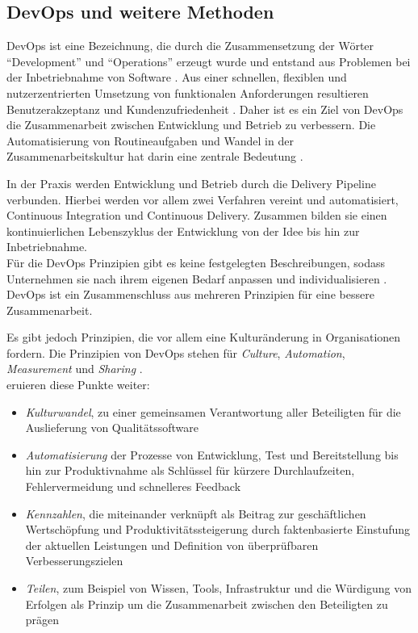 \subsection{DevOps und weitere Methoden}
DevOps ist eine Bezeichnung, die durch die Zusammensetzung der Wörter \enquote{Development} und \enquote{Operations} erzeugt wurde und entstand aus Problemen bei der Inbetriebnahme von Software \cite{mci/Disterer2011}. Aus einer schnellen, flexiblen und nutzerzentrierten Umsetzung von funktionalen Anforderungen resultieren Benutzerakzeptanz und Kundenzufriedenheit \cite{mci/Disterer2011, Alt2017}. Daher ist es ein Ziel von DevOps die Zusammenarbeit zwischen Entwicklung und Betrieb zu verbessern. Die Automatisierung von Routineaufgaben und Wandel in der Zusammenarbeitskultur hat darin eine zentrale Bedeutung \cite{Alt2017}. 

In der Praxis werden Entwicklung und Betrieb durch die Delivery Pipeline verbunden.
Hierbei werden vor allem zwei Verfahren vereint und automatisiert, Continuous Integration und Continuous Delivery. Zusammen bilden sie einen kontinuierlichen Lebenszyklus der Entwicklung von der Idee bis hin zur Inbetriebnahme.
\medskip
\\
Für die DevOps Prinzipien gibt es keine festgelegten Beschreibungen, sodass Unternehmen sie nach ihrem eigenen Bedarf anpassen und individualisieren \cite{Alt2017}. DevOps ist ein Zusammenschluss aus mehreren Prinzipien für eine bessere Zusammenarbeit.

Es gibt jedoch Prinzipien, die vor allem eine Kulturänderung in Organisationen fordern. Die Prinzipien von DevOps stehen für \emph{Culture}, \emph{Automation}, \emph{Measurement} und \emph{Sharing} \cite{humble:2011}. 
\medskip
\\
\citet[S.26f]{Alt2017} eruieren diese Punkte weiter:
\begin{itemize}
    \item \emph{Kulturwandel}, zu einer gemeinsamen Verantwortung aller Beteiligten für die Auslieferung von Qualitätssoftware
    \item \emph{Automatisierung} der Prozesse von Entwicklung, Test und Bereitstellung bis hin zur Produktivnahme als Schlüssel für kürzere Durchlaufzeiten, Fehlervermeidung und schnelleres Feedback
    \item \emph{Kennzahlen}, die miteinander verknüpft als Beitrag zur geschäftlichen Wertschöpfung und Produktivitätssteigerung durch faktenbasierte Einstufung der aktuellen Leistungen und Definition von überprüfbaren Verbesserungszielen
    \item \emph{Teilen}, zum Beispiel von Wissen, Tools, Infrastruktur und die Würdigung von Erfolgen als Prinzip um die Zusammenarbeit zwischen den Beteiligten zu prägen
\end{itemize}

